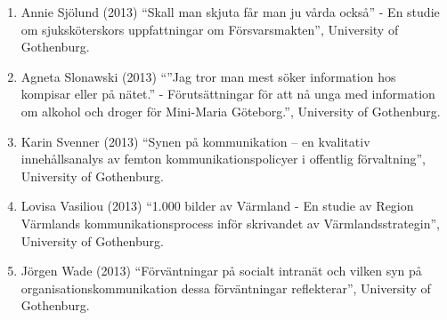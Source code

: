 \documentclass[a4paper,11pt,oneside]{article}
\begin{document}
\begin{enumerate}
             \item Annie Sjölund (2013) ``Skall man skjuta får man ju vårda också'' - En studie om sjuksköterskors uppfattningar om Försvarsmakten'', University of Gothenburg.
             \item Agneta Slonawski (2013) ``”Jag tror man mest söker information hos kompisar eller på nätet.” - Förutsättningar för att nå unga med information om alkohol och droger för Mini-Maria Göteborg.'', University of Gothenburg.
             \item Karin Svenner (2013) ``Synen på kommunikation – en kvalitativ innehållsanalys av femton kommunikationspolicyer i offentlig förvaltning'', University of Gothenburg.
             \item Lovisa Vasiliou (2013) ``1.000 bilder av Värmland - En studie av Region Värmlands kommunikationsprocess inför skrivandet av Värmlandsstrategin'', University of Gothenburg.
             \item Jörgen Wade (2013) ``Förväntningar på socialt intranät och vilken syn på organisationskommunikation dessa förväntningar reflekterar'', University of Gothenburg.
           \end{enumerate}
\end{document}
